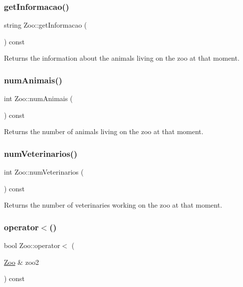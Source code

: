 \subsubsection{\texorpdfstring{get\+Informacao()}{getInformacao()}}
{\footnotesize\ttfamily string Zoo\+::get\+Informacao (\begin{DoxyParamCaption}{ }\end{DoxyParamCaption}) const}

Returns the information about the animals living on the zoo at that moment. \mbox{\label{class_zoo_acfffd5509d859246eece72999610f12f}} 
\subsubsection{\texorpdfstring{num\+Animais()}{numAnimais()}}
{\footnotesize\ttfamily int Zoo\+::num\+Animais (\begin{DoxyParamCaption}{ }\end{DoxyParamCaption}) const}

Returns the number of animals living on the zoo at that moment. \mbox{\label{class_zoo_a29354c84f702516e6be3164fa8511bb7}} 
\subsubsection{\texorpdfstring{num\+Veterinarios()}{numVeterinarios()}}
{\footnotesize\ttfamily int Zoo\+::num\+Veterinarios (\begin{DoxyParamCaption}{ }\end{DoxyParamCaption}) const}

Returns the number of veterinaries working on the zoo at that moment. \mbox{\label{class_zoo_a356d0617e61e139243faaf77c003ada2}} 
\subsubsection{\texorpdfstring{operator$<$()}{operator<()}}
{\footnotesize\ttfamily bool Zoo\+::operator$<$ (\begin{DoxyParamCaption}\item[{\mbox{\hyperlink{class_zoo}{Zoo}} \&}]{zoo2 }\end{DoxyParamCaption}) const}

